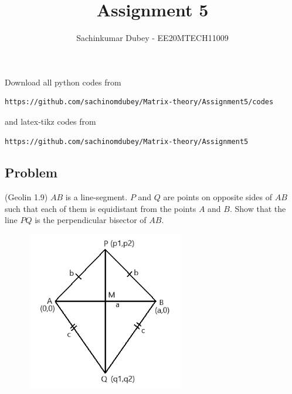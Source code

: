 \documentclass[journal,12pt,twocolumn]{IEEEtran}
\begin{document}
\def\putbox#1#2#3{\makebox[0in][l]{\makebox[#1][l]{}\raisebox{\baselineskip}[0in][0in]{\raisebox{#2}[0in][0in]{#3}}}}
     \def\rightbox#1{\makebox[0in][r]{#1}}
     \def\centbox#1{\makebox[0in]{#1}}
     \def\topbox#1{\raisebox{-\baselineskip}[0in][0in]{#1}}
     \def\midbox#1{\raisebox{-0.5\baselineskip}[0in][0in]{#1}}
\vspace{3cm}
\title{Assignment 5}
\author{Sachinkumar Dubey - EE20MTECH11009}

\maketitle
\newpage
\bigskip
\renewcommand{\thefigure}{\theenumi}
\renewcommand{\thetable}{\theenumi}
Download all python codes from 
\begin{lstlisting}
https://github.com/sachinomdubey/Matrix-theory/Assignment5/codes
\end{lstlisting}
%
and latex-tikz codes from 
%
\begin{lstlisting}
https://github.com/sachinomdubey/Matrix-theory/Assignment5
\end{lstlisting}
\subsection{Problem}
(Geolin 1.9) $AB$ is a line-segment. $P$ and $Q$ are points on opposite sides of $AB$ such that each of them is equidistant from the points $A$ and $B$. Show that the line $PQ $ is the perpendicular bisector of $AB$.
\begin{figure}[h!]
\centering
\includegraphics[width=7cm, height=7cm]{Figure_51}
\caption{}
\label{Fig4}
\end{figure}
\end{document}
